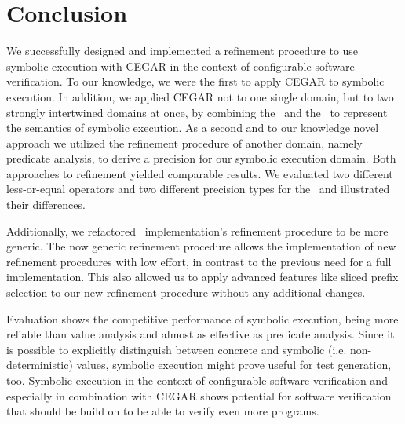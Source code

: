 \chapter{Conclusion}
We successfully designed and implemented a refinement procedure to use symbolic execution with CEGAR in the context of configurable software verification.
To our knowledge, we were the first to apply CEGAR to symbolic execution.
In addition, we applied CEGAR not to one single domain, but to two strongly intertwined domains at once, by combining the \symbolicValueAnalysisCPA\ and the \constraintsCPA\ to represent the semantics of symbolic execution.
As a second and to our knowledge novel approach we utilized the refinement procedure of another domain, namely predicate analysis, to derive a precision for our symbolic execution domain.
Both approaches to refinement yielded comparable results.
We evaluated two different less-or-equal operators and two different precision types for the \constraintsCPA\ and illustrated their differences.

Additionally, we refactored \ implementation's refinement procedure to be more generic.
The now generic refinement procedure allows the implementation of new refinement procedures with low effort, in contrast to the previous need for a full implementation.
This also allowed us to apply advanced features like sliced prefix selection to our new refinement procedure without any additional changes.

Evaluation shows the competitive performance of symbolic execution, being more reliable than value analysis and almost as effective as predicate analysis.
Since it is possible to explicitly distinguish between concrete and symbolic (i.e. non-deterministic) values, symbolic execution might prove useful for test generation, too.
Symbolic execution in the context of configurable software verification and especially in combination with CEGAR shows potential for software verification that should be build on to be able to verify even more programs.

